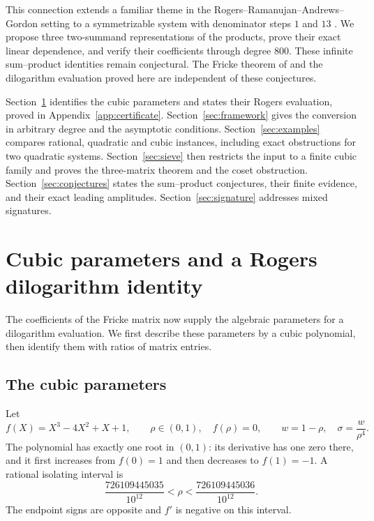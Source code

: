 \documentclass[11pt,reqno]{amsart}
\theoremstyle{remark}
\numberwithin{equation}{section}
\begin{document}
This connection extends a familiar theme in the
Rogers--Ramanujan--Andrews--Gordon setting \cite{Andrews,Kirillov} to a
symmetrizable system with denominator steps $1$ and $13$
\cite{Kanade,Mizuno}. We propose three two-summand representations of the
products, prove their exact linear dependence, and verify their coefficients
through degree $800$. These infinite sum--product identities remain
conjectural. The Fricke theorem of \cite{FrickeCompanion} and the dilogarithm
evaluation proved here are independent of these conjectures.

Section~\ref{sec:cubic} identifies the cubic parameters and states
their Rogers evaluation, proved in Appendix~\ref{app:certificate}.
Section~\ref{sec:framework} gives the conversion in arbitrary degree
and the asymptotic conditions. Section~\ref{sec:examples} compares
rational, quadratic and cubic instances, including exact obstructions
for two quadratic systems. Section~\ref{sec:sieve} then restricts the
input to a finite cubic family and proves the three-matrix theorem and
the coset obstruction. Section~\ref{sec:conjectures} states the
sum--product conjectures, their finite evidence, and their exact
leading amplitudes.
Section~\ref{sec:signature} addresses mixed signatures.

\section{Cubic parameters and a Rogers dilogarithm identity}\label{sec:cubic}
The coefficients of the Fricke matrix now supply the algebraic parameters
for a dilogarithm evaluation. We first describe these parameters by a
cubic polynomial, then identify them with ratios of matrix entries.

\subsection{The cubic parameters}
Let
\begin{equation}\label{eq:rho}
 f(X)=X^3-4X^2+X+1,\qquad \rho\in(0,1),\quad f(\rho)=0,
 \qquad w=1-\rho,\quad \sigma=\frac{w}{\rho^4}.
\end{equation}
The polynomial has exactly one root in $(0,1)$: its derivative has one zero
there, and it first increases from $f(0)=1$ and then decreases to $f(1)=-1$.
A rational isolating interval is
\begin{equation}\label{eq:rhointerval}
 \frac{726109445035}{10^{12}}<\rho<\frac{726109445036}{10^{12}}.
\end{equation}
The endpoint signs are opposite and $f'$ is negative on this interval.
\end{document}

